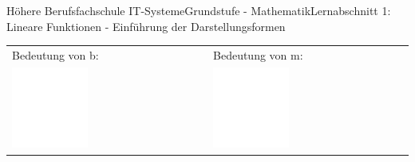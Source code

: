 \documentclass[oneside,openany,headings=optiontotoc,11pt,numbers=noenddot]{scrreprt}
\begin{document}
\begin{worksheet}{Höhere Berufsfachschule IT-Systeme}{Grundstufe - Mathematik}{Lernabschnitt 1: Lineare Funktionen - Einführung der Darstellungsformen}
\begin{framed}
\begin{tabularx}{\textwidth}{X|X}
				\small{\color{codegray}Bedeutung von b:} & 			\small{\color{codegray}Bedeutung von m:}\\
				\includegraphics[width=0.4\textwidth]{../../empty.jpg} & \includegraphics[width=0.4\textwidth]{../../empty.jpg}\\
			\end{tabularx}
		\end{framed}
	\end{worksheet}
\end{document}
